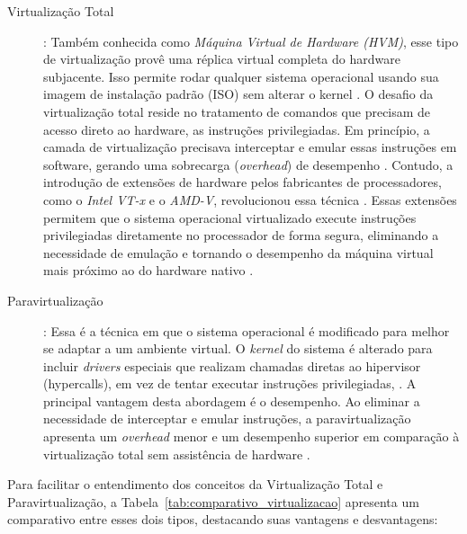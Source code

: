 \begin{description}
    \item[Virtualização Total]: Também conhecida como \textit{Máquina Virtual de Hardware (HVM)}, esse tipo de virtualização provê uma réplica virtual completa do hardware subjacente. Isso permite rodar qualquer sistema operacional usando sua imagem de instalação padrão (ISO) sem alterar o kernel \cite{carissimi2008}. O desafio da virtualização total reside no tratamento de comandos que precisam de acesso direto ao hardware, as instruções privilegiadas. Em princípio, a camada de virtualização precisava interceptar e emular essas instruções em software, gerando uma sobrecarga (\textit{overhead}) de desempenho \cite{carissimi2008}. Contudo, a introdução de extensões de hardware pelos fabricantes de processadores, como o \textit{Intel VT-x} e o \textit{AMD-V}, revolucionou essa técnica \cite{carissimi2008}. Essas extensões permitem que o sistema operacional virtualizado execute instruções privilegiadas diretamente no processador de forma segura, eliminando a necessidade de emulação e tornando o desempenho da máquina virtual mais próximo ao do hardware nativo \cite{chawla2025}.
    \item[Paravirtualização]: Essa é a técnica em que o sistema operacional é modificado para melhor se adaptar a um ambiente virtual. O \textit{kernel} do sistema é alterado para incluir \textit{drivers} especiais que realizam chamadas diretas ao hipervisor (hypercalls), em vez de tentar executar instruções privilegiadas, \cite{carissimi2008}. A principal vantagem desta abordagem é o desempenho. Ao eliminar a necessidade de interceptar e emular instruções, a paravirtualização apresenta um \textit{overhead} menor e um desempenho superior em comparação à virtualização total sem assistência de hardware \cite{carissimi2008}.
\end{description}

Para facilitar o entendimento dos conceitos da Virtualização Total e Paravirtualização, a Tabela~\ref{tab:comparativo_virtualizacao} apresenta um comparativo entre esses dois tipos, destacando suas vantagens e desvantagens:

